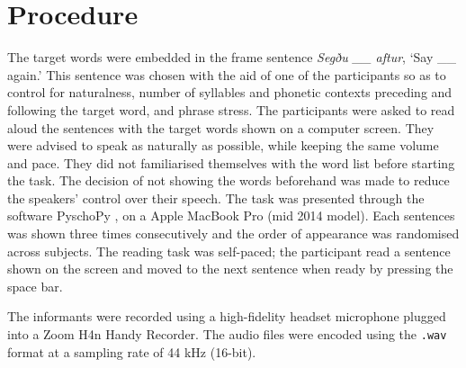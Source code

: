 

\section{Procedure}

The target words were embedded in the frame sentence \textit{Segðu \_\_ aftur}, `Say \_\_ again.'
This sentence was chosen with the aid of one of the participants so as to control for naturalness, number of syllables and phonetic contexts preceding and following the target word, and phrase stress.
The participants were asked to read aloud the sentences with the target words shown on a computer screen.
They were advised to speak as naturally as possible, while keeping the same volume and pace.
They did not familiarised themselves with the word list before starting the task.
The decision of not showing the words beforehand was made to reduce the speakers' control over their speech.
The task was presented through the software PyschoPy \citep{peirce2009}, on a Apple MacBook Pro (mid 2014 model).
Each sentences was shown three times consecutively and the order of appearance was randomised across subjects.
The reading task was self-paced; the participant read a sentence shown on the screen and moved to the next sentence when ready by pressing the space bar.

The informants were recorded using a high-fidelity headset microphone plugged into a Zoom H4n Handy Recorder.
The audio files were encoded using the \texttt{.wav} format at a sampling rate of 44 kHz (16-bit).







